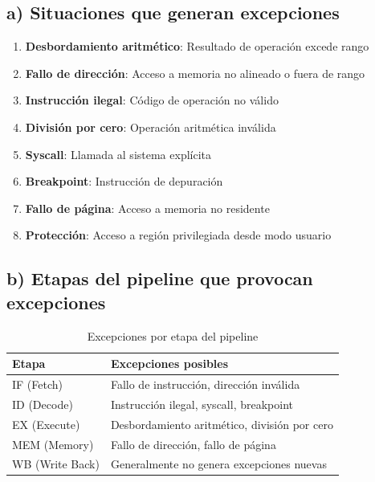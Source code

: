 \documentclass[12pt,a4paper]{article}
\begin{document}
\subsection{a) Situaciones que generan excepciones}

\begin{enumerate}
    \item \textbf{Desbordamiento aritmético}: Resultado de operación excede rango
    \item \textbf{Fallo de dirección}: Acceso a memoria no alineado o fuera de rango
    \item \textbf{Instrucción ilegal}: Código de operación no válido
    \item \textbf{División por cero}: Operación aritmética inválida
    \item \textbf{Syscall}: Llamada al sistema explícita
    \item \textbf{Breakpoint}: Instrucción de depuración
    \item \textbf{Fallo de página}: Acceso a memoria no residente
    \item \textbf{Protección}: Acceso a región privilegiada desde modo usuario
\end{enumerate}

\subsection{b) Etapas del pipeline que provocan excepciones}

\begin{table}[H]
\centering
\begin{tabular}{|l|l|}
\hline
\textbf{Etapa} & \textbf{Excepciones posibles} \\
\hline
IF (Fetch) & Fallo de instrucción, dirección inválida \\
\hline
ID (Decode) & Instrucción ilegal, syscall, breakpoint \\
\hline
EX (Execute) & Desbordamiento aritmético, división por cero \\
\hline
MEM (Memory) & Fallo de dirección, fallo de página \\
\hline
WB (Write Back) & Generalmente no genera excepciones nuevas \\
\hline
\end{tabular}
\caption{Excepciones por etapa del pipeline}
\end{table}
\end{document}
